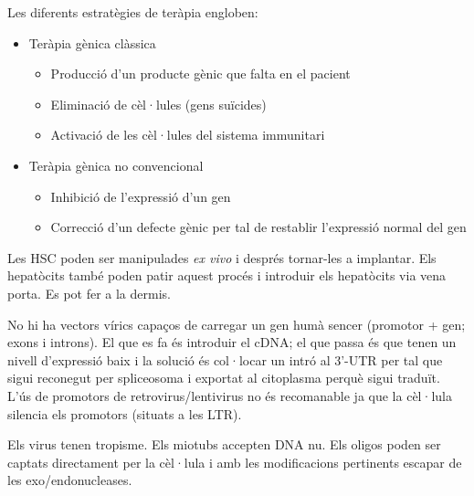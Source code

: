 Les diferents estratègies de teràpia engloben:
\begin{itemize}
\item Teràpia gènica clàssica
  \begin{itemize}
  \item Producció d'un producte gènic que falta en el pacient
  \item Eliminació de cèl·lules (gens suïcides)
  \item Activació de les cèl·lules del sistema immunitari
  \end{itemize}

\item Teràpia gènica no convencional
  \begin{itemize}
  \item Inhibició de l'expressió d'un gen
  \item Correcció d'un defecte gènic per tal de restablir l'expressió normal del gen
  \end{itemize}
\end{itemize}

Les HSC poden ser manipulades \textit{ex vivo} i després tornar-les a implantar. Els hepatòcits també poden patir aquest procés i introduir els hepatòcits via vena porta. Es pot fer a la dermis.

No hi ha vectors vírics capaços de carregar un gen humà sencer (promotor + gen; exons i introns). El que es fa és introduir el cDNA; el que passa és que tenen un nivell d'expressió baix i la solució és col·locar un intró al 3'-UTR per tal que sigui reconegut per spliceosoma i exportat al citoplasma perquè sigui traduït. L'ús de promotors de retrovirus/lentivirus no és recomanable ja que la cèl·lula silencia els promotors (situats a les LTR).

Els virus tenen tropisme. Els miotubs accepten DNA nu. Els oligos poden ser captats directament per la cèl·lula i amb les modificacions pertinents escapar de les exo/endonucleases.